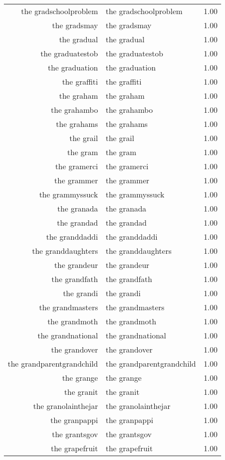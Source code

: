 \begin{table}[ht]
\begin{tabular}{rlr}
  the gradschoolproblem & the gradschoolproblem & 1.00 \\ 
  the gradsmay & the gradsmay & 1.00 \\ 
  the gradual & the gradual & 1.00 \\ 
  the graduatestob & the graduatestob & 1.00 \\ 
  the graduation & the graduation & 1.00 \\ 
  the graffiti & the graffiti & 1.00 \\ 
  the graham & the graham & 1.00 \\ 
  the grahambo & the grahambo & 1.00 \\ 
  the grahams & the grahams & 1.00 \\ 
  the grail & the grail & 1.00 \\ 
  the gram & the gram & 1.00 \\ 
  the gramerci & the gramerci & 1.00 \\ 
  the grammer & the grammer & 1.00 \\ 
  the grammyssuck & the grammyssuck & 1.00 \\ 
  the granada & the granada & 1.00 \\ 
  the grandad & the grandad & 1.00 \\ 
  the granddaddi & the granddaddi & 1.00 \\ 
  the granddaughters & the granddaughters & 1.00 \\ 
  the grandeur & the grandeur & 1.00 \\ 
  the grandfath & the grandfath & 1.00 \\ 
  the grandi & the grandi & 1.00 \\ 
  the grandmasters & the grandmasters & 1.00 \\ 
  the grandmoth & the grandmoth & 1.00 \\ 
  the grandnational & the grandnational & 1.00 \\ 
  the grandover & the grandover & 1.00 \\ 
  the grandparentgrandchild & the grandparentgrandchild & 1.00 \\ 
  the grange & the grange & 1.00 \\ 
  the granit & the granit & 1.00 \\ 
  the granolainthejar & the granolainthejar & 1.00 \\ 
  the granpappi & the granpappi & 1.00 \\ 
  the grantsgov & the grantsgov & 1.00 \\ 
  the grapefruit & the grapefruit & 1.00 \\ 

\end{tabular}
\end{table}
